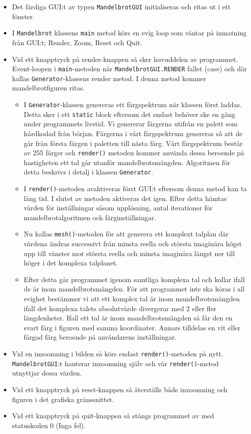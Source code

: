 \documentclass[a4paper]{article}
\newcommand{\code}[1]{\texttt{#1}} %
\begin{document}
\begin{itemize}
\item Det färdiga GUI:t av typen \code{MandelbrotGUI} initialiseras och ritas ut i ett fönster.
\item I \code{Mandelbrot} klassens \code{main} metod körs en evig loop som väntar på inmatning från GUI:t; Render, Zoom, Reset och Quit.
\item Vid ett knapptryck på render-knappen så sker huvuddelen av programmet. Event-loopen i \code{main}-metoden når \code{MandelbrotGUI.RENDER} fallet (case) och där kallas \code{Generator}-klassens render metod. I denna metod kommer mandelbrotfiguren ritas.
\begin{itemize}
	\item I \code{Generator}-klassen genereras ett färgspektrum när klassen först laddas. Detta sker i ett \code{static} block eftersom det endast behöver ske en gång under programmets livstid. Vi genererar färgerna utifrån en palett som hårdkodad från början. \newline
	Färgerna i vårt färgspektrum genereras så att de går från första färgen i paletten till nästa färg. Vårt färgspektrum består av 255 färger och \code{render()} metoden kommer använda dessa beroende på hastigheten ett tal går utanför mandelbrotsmängden. Algoritmen för detta beskrivs i detalj i klassen \code{Generator}.
	\item I \code{render()}-metoden avaktiveras först GUI:t eftersom denna metod kan ta lång tid. I slutet av metoden aktiveras det igen. Efter detta hämtas värden för inställningar såsom upplösning, antal iterationer för mandelbrotalgoritmen och färginställningar.
	\item Nu kallas \code{mesh()}-metoden för att generera ett komplext talplan där värdena ändras successivt från minsta reella och största imaginära högst upp till vänster mot största reella och minsta imaginära längst ner till höger i det komplexa talplanet.
	\item Efter detta går programmet igenom samtliga komplexa tal och kollar ifall de är inom mandelbrotsmängden. För att programmet inte ska köras i all evighet bestämmer vi att ett komplex tal är inom mandelbrotsmängden ifall det komplexa talets absolutvärde divergerar med 2 eller fler längdenheter. Ifall ett tal är inom mandelbrotsmängden så får den en svart färg i figuren med samma koordinater. Annars tilldelas en vit eller färgad färg beroende på användarens inställningar.
\end{itemize}
\item Vid en inzoomning i bilden så körs endast \code{render()}-metoden på nytt. \code{MandelbrotGUI}:t hanterar inzoomning själv och vår \code{render()}-metod utnyttjar dessa värden.
\item Vid ett knapptryck på reset-knappen så återställs både inzoomning och figuren i det grafiska gränssnittet.
\item Vid ett knapptryck på quit-knappen så stängs programmet av med statuskoden 0 (Inga fel).
\end{itemize}
\end{document}

